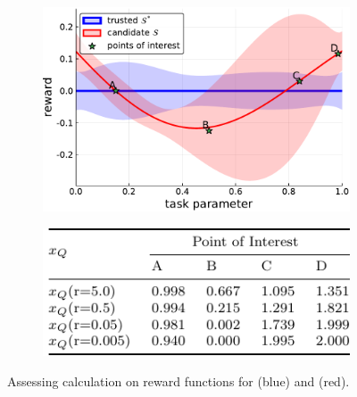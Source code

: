 \begin{figure}[tbp]
    \centering
    \begin{subfigure}[c]{0.65\linewidth}
        \centering
        \includegraphics[width=0.8\linewidth]{Figures/p1.pdf}
        \vfill
    \end{subfigure}%
    \hfill
    \begin{subfigure}[t]{0.35\linewidth}
        \centering
        \includegraphics[width=1.0\linewidth]{Figures/p1_table.pdf}
    \end{subfigure} 
    \caption{Assessing \xQ{} calculation on reward functions for \solvestar{} (blue) and \solve{} (red).} %
    \label{fig:sq_thry1}
\end{figure}
